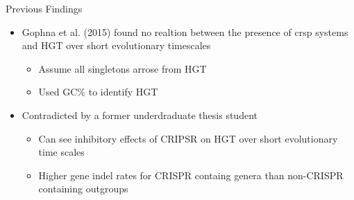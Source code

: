 \documentclass[dvipsnames]{beamer}
\begin{document}
\begin{frame}[fragile]{Previous Findings}
    \begin{itemize}
        \item<2-> Gophna et al. (2015) found no realtion between the presence of \ac{crsp} systems and HGT over short evolutionary timescales\autocite{gophna15}
        \begin{itemize}
            \item<3-> Assume all singletons arrose from HGT
            \item<4-> Used GC\% to identify HGT
        \end{itemize}
        \item<5-> Contradicted by a former underdraduate thesis student
        \begin{itemize}
            \item<6-> Can see inhibitory effects of CRIPSR on HGT over short evolutionary time scales
            \item<7-> Higher gene indel rates for CRISPR containg genera than non-CRISPR containing outgroups
        \end{itemize}
    \end{itemize}
\end{frame}
\end{document}
